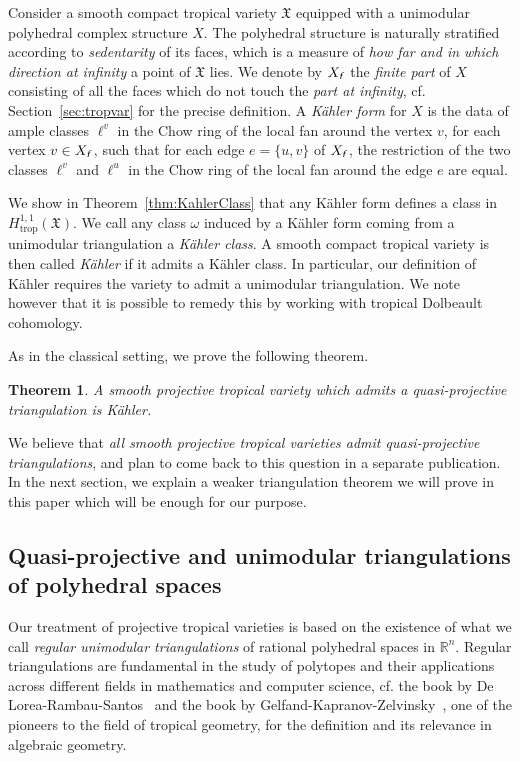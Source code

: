\documentclass[11pt]{amsart}
\newtheorem{thm}{Theorem}[section]
\theoremstyle{definition}
\numberwithin{equation}{section}
\newcommand{\cf}[1]{cf.}
\renewcommand{\~}{\widetilde}
\newcommand{\R}{\mathbb{R}}
\newcommand{\trop}{\mathrm{trop}} %
\newcommand{\f}{{\textnormal{\textsl{\textsf f}}}} %
\newcommand{\X}{\mathfrak X}
\begin{document}
\medskip

Consider a smooth compact tropical variety $\X$ equipped with a unimodular polyhedral complex structure $X$. The polyhedral structure is naturally stratified according to \emph{sedentarity} of its faces, which is a measure of \emph{how far and in which direction at infinity} a point of $\X$ lies. We denote by $X_\f$ the \emph{finite part} of $X$ consisting of all the faces which do not touch the \emph{part at infinity}, \cf. Section~\ref{sec:tropvar} for the precise definition. A \emph{Kähler form} for $X$ is the data of ample classes $\ell^v$ in the Chow ring of the local fan around the vertex $v$, for each vertex $v\in X_\f$, such that for each edge $e=\{u,v\}$ of $X_\f$, the restriction of the two classes $\ell^v$ and $\ell^u$ in the Chow ring of the local fan around the edge $e$ are equal.

We show in Theorem~\ref{thm:KahlerClass} that any K\"ahler form defines a class in $H_\trop^{1,1}(\X)$. We call any class $\omega$ induced by a K\"ahler form coming from a unimodular triangulation a \emph{K\"ahler class}. A smooth compact tropical variety is then called \emph{K\"ahler} if it admits a Kähler class. In particular, our definition of K\"ahler requires the variety to admit a unimodular triangulation. We note however that it is possible to remedy this by working with tropical Dolbeault cohomology.

\smallskip
As in the classical setting, we prove the following theorem.
\begin{thm} A smooth projective tropical variety which admits a quasi-projective triangulation is K\"ahler.
\end{thm}
We believe that \emph{all smooth projective tropical varieties admit quasi-projective triangulations}, and plan to come back to this question in a separate publication. In the next section, we explain a weaker triangulation theorem we will prove in this paper which will be enough for our purpose.



\subsection{Quasi-projective and unimodular triangulations of polyhedral spaces} Our treatment of projective tropical varieties is based on the existence of what we call \emph{regular unimodular triangulations} of rational polyhedral spaces in $\R^n$. Regular triangulations are fundamental in the study of polytopes and their applications across different fields in mathematics and computer science, \cf. the book by De Lorea-Rambau-Santos~\cite{DRS} and the book by Gelfand-Kapranov-Zelvinsky~\cite{GKZ}, one of the pioneers to the field of tropical geometry, for the definition and its relevance in algebraic geometry.
\end{document}
